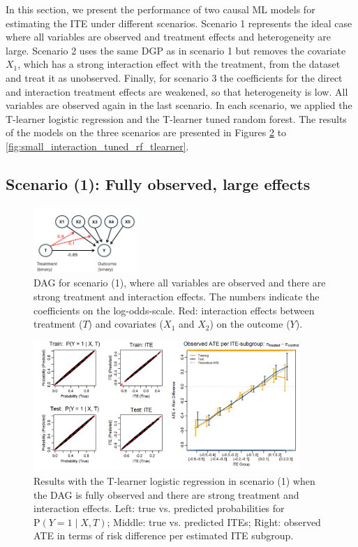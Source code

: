In this section, we present the performance of two causal ML models for estimating the ITE under different scenarios. Scenario 1 represents the ideal case where all variables are observed and treatment effects and heterogeneity are large. Scenario 2 uses the same DGP as in scenario 1 but removes the covariate $X_1$, which has a strong interaction effect with the treatment, from the dataset and treat it as unobserved. Finally, for scenario 3 the coefficients for the direct and interaction treatment effects are weakened, so that heterogeneity is low. All variables are observed again in the last scenario. In each scenario, we applied the T-learner logistic regression and the T-learner tuned random forest. The results of the models on the three scenarios are presented in Figures \ref{fig:fully_observed_glm_tlearner} to \ref{fig:small_interaction_tuned_rf_tlearner}.



\subsection{Scenario (1): Fully observed, large effects}



\begin{figure}[htbp]
\centering
\includegraphics[width=0.35\textwidth]{img/results_ITE_simulation/simulation_observed.png}
\caption{DAG for scenario (1), where all variables are observed and there are strong treatment and interaction effects. The numbers indicate the coefficients on the log-odds-scale. Red: interaction effects between treatment ($T$) and covariates ($X_1$ and $X_2$) on the outcome ($Y$).}
\label{fig:fully_observed_dag}
\end{figure}


\begin{figure}[htbp]
\centering
\includegraphics[width=0.9\textwidth]{img/results_ITE_simulation/fully_observed_glm_tlearner.png}
\caption{Results with the T-learner logistic regression in scenario (1) when the DAG is fully observed and there are strong treatment and interaction effects. Left: true vs. predicted probabilities for $\text{P}(Y=1 \mid X, T)$; Middle: true vs. predicted ITEs; Right: observed ATE in terms of risk difference per estimated ITE subgroup.}
\label{fig:fully_observed_glm_tlearner}
\end{figure}


